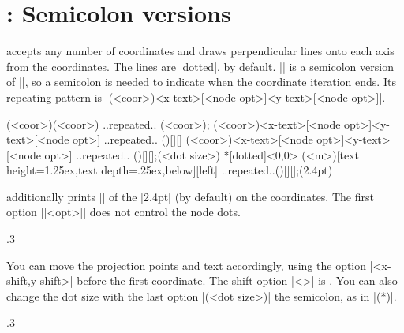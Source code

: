 \section{\protect\cmd{\tzprojs(*)}: Semicolon versions}
\label{s:tzprojs}

\icmd{\tzprojs} accepts any number of coordinates and draws perpendicular lines onto each axis from the coordinates. The lines are |dotted|, by default.
|\tzprojs| is a semicolon version of |\tzproj|, so a semicolon is needed to indicate when the coordinate iteration ends. Its repeating pattern is |(<coor>){<x-text>}[<node opt>]{<y-text>}[<node opt>]|. 

\begin{tzdef}{}
\tzprojs(<coor>)(<coor>) ..repeated.. (<coor>);
\tzprojs*(<coor>){<x-text>}[<node opt>]{<y-text>}[<node opt>]
         ..repeated.. (){}[]{}[]
         (<coor>){<x-text>}[<node opt>]{<y-text>}[<node opt>]
         ..repeated.. (){}[]{}[];(<dot size>)
 *[dotted]<0,0>
  (<m>){}[text height=1.25ex,text depth=.25ex,below]{}[left]
  ..repeated..(){}[]{}[];(2.4pt)
\end{tzdef}

\icmd{\tzprojs*} additionally prints |\tzdots*| of the |2.4pt| (by default) on the coordinates.
The first option |[<opt>]| does not control the node dots.

\begin{tzcode}{.3}
\end{tzcode}

You can move the projection points and text accordingly, using the option |<x-shift,y-shift>| before the first coordinate. The  shift option |<>| is .
You can also change the dot size with the last option |(<dot size>)|  the semicolon, as in |\tzproj(*)|.

\begin{tzcode}{.3}
\end{tzcode}


